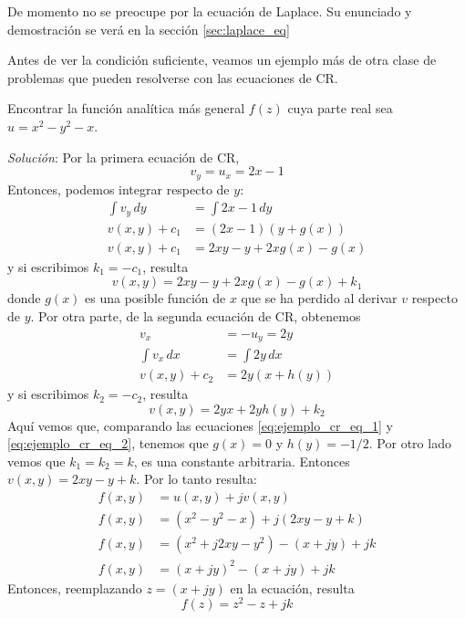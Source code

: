 De momento no se preocupe por la ecuación de Laplace. Su enunciado y demostración se verá en la sección \ref{sec:laplace_eq}

Antes de ver la condición suficiente, veamos un ejemplo más de otra clase de problemas que pueden resolverse con las ecuaciones de CR.
\begin{example}
  Encontrar la función analítica más general $f(z)$ cuya parte real sea $u=x^2-y^2-x$.

  \textit{Solución}: Por la primera ecuación de CR,
  \[
    v_y = u_x = 2x-1
  \]
  Entonces, podemos integrar respecto de $y$:
  \begin{align*}
    \int v_y \, dy &= \int 2x -1 \, dy \\ 
    v(x,y) + c_1 &= (2x-1)(y+g(x)) \\ 
    v(x,y) + c_1 &= 2xy - y + 2xg(x) - g(x) 
  \end{align*}
  y si escribimos $k_1=-c_1$, resulta
  \begin{equation}\label{eq:ejemplo_cr_eq_1}
    v(x,y) = 2xy - y + 2xg(x) - g(x) + k_1
  \end{equation}
  donde $g(x)$ es una posible función de $x$ que se ha perdido al derivar $v$ respecto de $y$. Por otra parte, de la segunda ecuación de CR, obtenemos
  \begin{align*}
    v_x &= -u_y = 2y \\ 
    \int v_x \,dx &= \int 2y \, dx \\ 
    v(x,y) + c_2 &= 2y (x + h(y)) 
  \end{align*}
  y si escribimos $k_2=-c_2$, resulta
  \begin{equation}\label{eq:ejemplo_cr_eq_2}
    v(x,y) = 2yx + 2yh(y) + k_2
  \end{equation}
  Aquí vemos que, comparando las ecuaciones \ref{eq:ejemplo_cr_eq_1} y \ref{eq:ejemplo_cr_eq_2}, tenemos que $g(x)=0$ y $h(y)=-1/2$. Por otro lado vemos que $k_1 = k_2 = k$, es una constante arbitraria. Entonces $v(x,y)=2xy - y + k$. Por lo tanto resulta:
  \begin{align*}
    f(x,y) &= u(x,y) + jv(x,y) \\ 
    f(x,y) &= (x^2-y^2-x) + j(2xy - y + k) \\ 
    f(x,y) &= (x^2 + j2xy - y^2) - (x+jy) + jk \\ 
    f(x,y) &= (x+jy)^2 - (x+jy) + jk
  \end{align*}
  Entonces, reemplazando $z=(x+jy)$ en la ecuación, resulta
  \[
    \boxed{f(z) = z^2 - z + jk}
  \]
\end{example}

